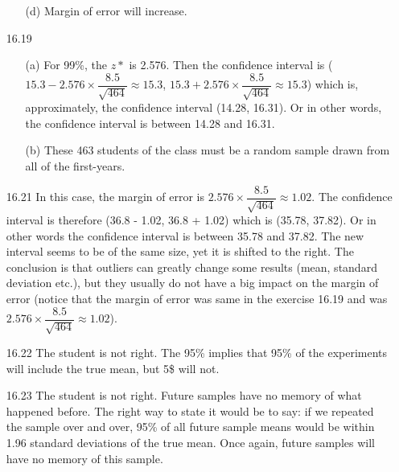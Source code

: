 \documentclass[11pt, a4paper]{article}
\begin{document}
\begin{itemize}
\begin{itemize}
\item[]

\item[(d)]
Margin of error will increase.
\end{itemize}

\item[]
\item[]

\item[16.19]
\begin{itemize}
\item[(a)]
For 99\%, the $z*$ is 2.576. Then the confidence interval
is ($15.3 - 2.576 \times \dfrac{8.5}{\sqrt{464}} \approx 15.3$, $15.3 + 2.576 \times \dfrac{8.5}{\sqrt{464 }} \approx 15.3$)
which is, approximately, the confidence interval (14.28, 16.31). Or in other words,
the confidence interval is between 14.28 and 16.31.

\item[]

\item[(b)]
These 463 students of the class must be a random
sample drawn from all of the first-years.
\end{itemize}

\item[]
\item[]

\item[16.21]
In this case, the margin of error is $2.576 \times \dfrac{8.5}{\sqrt{464}} \approx 1.02$.
The confidence interval is therefore (36.8 - 1.02, 36.8 + 1.02) which is (35.78, 37.82).
Or in other words the confidence interval is between 35.78 and 37.82.
The new interval seems to be of the same size, yet it is shifted to the right.
The conclusion is that outliers can greatly change some results (mean, standard deviation etc.),
but they usually do not have a big impact on the margin of error (notice that the margin
of error was same in the exercise 16.19 and was $2.576 \times \dfrac{8.5}{\sqrt{464}} \approx 1.02$).

\item[]
\item[]

\item[16.22]
The student is not right. The 95\% implies that 95\% of the experiments
will include the true mean, but 5\$ will not.

\item[]
\item[]

\item[16.23]
The student is not right. Future samples have no memory of what happened before.
The right way to state it would be to say: if we repeated the sample over and over,
95\% of all future sample means would be within 1.96 standard deviations of the true mean.
Once again, future samples will have no memory of this sample.
\end{itemize}
\end{document}
